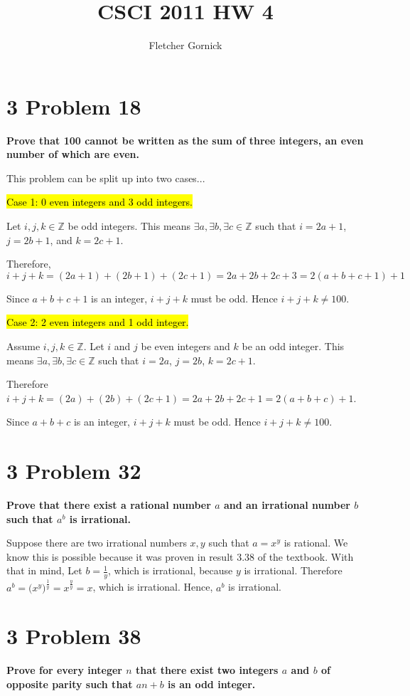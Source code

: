 \documentclass[10pt]{article}
\title{CSCI 2011 HW 4}
\author{Fletcher Gornick}
\def \n {\par \vspace{\baselineskip}}
\begin{document}
\maketitle

\section{3 Problem 18}
\textbf{Prove that 100 cannot be written as the sum of three integers, an even number of which are even.}

\n
This problem can be split up into two cases...
\n
\hl{Case 1: 0 even integers and 3 odd integers.}

Let $i,j,k \in \mathbb{Z}$ be odd integers.  This means $\exists a, \exists b, \exists c \in \mathbb{Z}$
such that $i = 2a + 1$, $j = 2b + 1$, and $k = 2c + 1$. 

Therefore, $i + j + k = (2a+1) + (2b+1) + (2c+1) = 2a + 2b + 2c + 3 = 2(a + b + c + 1) + 1$

Since $a + b + c + 1$ is an integer, $i + j + k$ must be odd.  Hence $i + j + k \not= 100$.

\n
\hl{Case 2: 2 even integers and 1 odd integer.}

Assume $i,j,k \in \mathbb{Z}$.  Let $i$ and $j$ be even integers and $k$ be an odd integer.  This means
$\exists a, \exists b, \exists c \in \mathbb{Z}$ such that $i = 2a$, $j = 2b$, $k = 2c + 1$.

Therefore $i + j + k = (2a) + (2b) + (2c+1) = 2a + 2b + 2c + 1 = 2(a + b + c) + 1$.

Since $a + b + c$ is an integer, $i + j + k$ must be odd.  Hence $i + j + k \not= 100$.



\section{3 Problem 32}
\textbf{Prove that there exist a rational number $a$ and an irrational number $b$ such that $a^b$ is irrational.}

\n
Suppose there are two irrational numbers $x,y$ such that $a = x^y$ is rational.  We know this is possible because it was proven in result 3.38
of the textbook. With that in mind, Let $b = \frac{1}{y}$, which is irrational, because $y$ is irrational.  Therefore 
$a^b = \big(x^y\big)^\frac{1}{y} = x^\frac{y}{y} = x$, which is irrational.  Hence, $a^b$ is irrational.


\section{3 Problem 38}
\textbf{Prove for every integer $n$ that there exist two integers $a$ and $b$ of opposite parity such that $an + b$ is an odd integer.}
\end{document}

